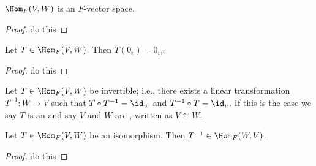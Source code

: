     \begin{proposition}
        $\Hom_F{(V,W)}$ is an $F$-vector space.
    \end{proposition}
        \begin{proof}
            \color{red} do this
        \end{proof}
    
    \begin{lemma}
        Let $T \in \Hom_F{(V,W)}$. Then $T(0_v) = 0_w$.
    \end{lemma}
        \begin{proof}
            \color{red} do this
        \end{proof}

    \begin{definition}
        Let $T \in \Hom_F{(V,W)}$ be invertible; i.e., there exists a linear transformation $T^{-1}:W \rightarrow V$ such that $T \circ T^{-1} = \id_w$ and $T^{-1} \circ T = \id_v$. If this is the case we say $T$ is an  and say $V$ and $W$ are , written as $V \cong W$.
    \end{definition}

    \begin{proposition}
        Let $T \in \Hom_F{(V,W)}$ be an isomorphism. Then $T^{-1} \in \Hom_F{(W,V)}$.
    \end{proposition}
        \begin{proof}
            \color{red} do this
        \end{proof}

